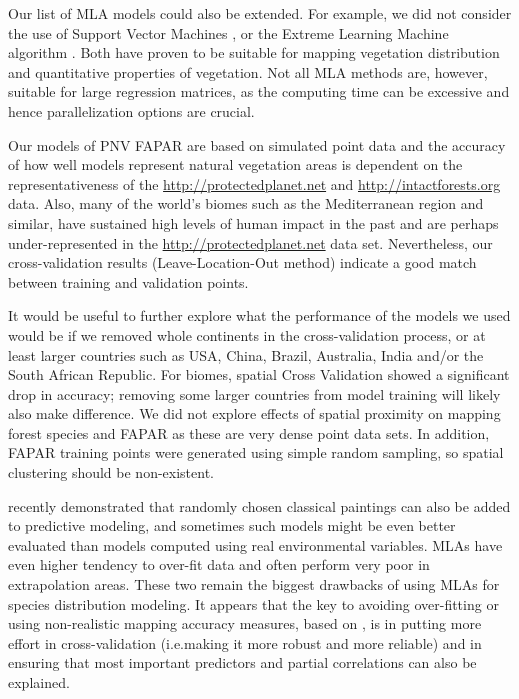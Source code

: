 \documentclass[fleqn,10pt,lineno]{wlpeerj} %
\begin{document}
Our list of MLA models could also be extended. For example, we did not consider the use of Support Vector Machines \citep{li2016comparison}, or the Extreme Learning Machine algorithm \citep{deo2015application}. Both have proven to be suitable for mapping vegetation distribution and quantitative properties of vegetation. Not all MLA methods are, however, suitable for large regression matrices, as the computing time can be excessive and hence parallelization options are crucial.\par 

Our models of PNV FAPAR are based on simulated point data and the accuracy of how well models represent natural vegetation areas is dependent on the representativeness of the \url{http://protectedplanet.net} and \url{http://intactforests.org} data. Also, many of the world's biomes such as the Mediterranean region and similar, have sustained high levels of human impact in the past and are perhaps under-represented in the \url{http://protectedplanet.net} data set. Nevertheless, our cross-validation results (Leave-Location-Out method) indicate a good match between training and validation points. \par

It would be useful to further explore what the performance of the models we used would be if we removed whole continents in the cross-validation process, or at least larger countries such as USA, China, Brazil, Australia, India and/or the South African Republic. For biomes, spatial Cross Validation showed a significant drop in accuracy; removing some larger countries from model training will likely also make difference. We did not explore effects of spatial proximity on mapping forest species and FAPAR as these are very dense point data sets. In addition, FAPAR training points were generated using simple random sampling, so spatial clustering should be non-existent.\par

\citet{fourcade2018paintings} recently demonstrated that randomly chosen classical paintings can also be added to predictive modeling, and sometimes such models might be even better evaluated than models computed using real environmental variables. MLAs have even higher tendency to over-fit data and often perform very poor in extrapolation areas. These two remain the biggest drawbacks of using MLAs for species distribution modeling. It appears that the key to avoiding over-fitting or using non-realistic mapping accuracy measures, based on \citet{fourcade2018paintings}, is in putting more effort in cross-validation (i.e.\@ making it more robust and more reliable) and in ensuring that most important predictors and partial correlations can also be explained.\par
\end{document}
